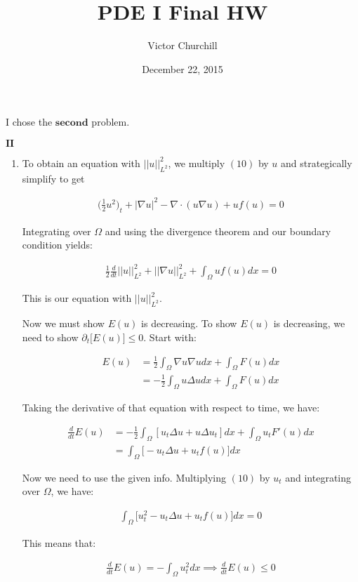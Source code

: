 \documentclass[12pt, letterpaper]{article}
\title{\vspace{-3ex}
{\bf \Large PDE I Final HW} \vspace{-1ex}}
\author{Victor Churchill}
\date{December 22, 2015}
\begin{document}
\maketitle

I chose the $\mathbf{second}$ problem.

$\mathbf{II}$
\begin{enumerate}
\item 

To obtain an equation with $||u||^2_{L^2}$, we multiply $(10)$ by $u$ and strategically simplify to get

\begin{align}
\big(\frac{1}{2}u^2\big)_t+|\nabla u|^2-\nabla \cdot(u\nabla u)+uf(u)=0
\end{align}

Integrating over $\Omega$ and using the divergence theorem and our boundary condition yields:

\begin{align}
\frac{1}{2}\frac{d}{dt}||u||_{L^2}^2+||\nabla u||^2_{L^2}+\int_\Omega u f(u)dx=0
\end{align}

This is our equation with $||u||^2_{L^2}$.

Now we must show $E(u)$ is decreasing. To show $E(u)$ is decreasing, we need to show $\partial_t\big[E(u)\big]\le 0$. Start with:

\begin{align}
E(u)&=\frac{1}{2}\int_\Omega\nabla u \nabla u dx+ \int_\Omega F(u)dx\\
&=-\frac{1}{2}\int_\Omega u\Delta u dx + \int_\Omega F(u)dx
\end{align}

Taking the derivative of that equation with respect to time, we have:

\begin{align}
\frac{d}{dt}E(u)&=-\frac{1}{2}\int_\Omega [u_t\Delta u + u\Delta u_t]dx +\int_\Omega u_tF'(u)dx\\
&=\int_\Omega \big[-u_t\Delta u+ u_tf(u)\big]dx
\end{align}

Now we need to use the given info. Multiplying $(10)$ by $u_t$ and integrating over $\Omega$, we have:

\begin{align}
\int_\Omega\big[u_t^2-u_t\Delta u +u_tf(u)\big]dx=0
\end{align}

This means that:

\begin{align}
\frac{d}{dt}E(u)=-\int_\Omega u_t^2dx \implies \frac{d}{dt}E(u)\le 0
\end{align}


\end{enumerate}
\end{document}
